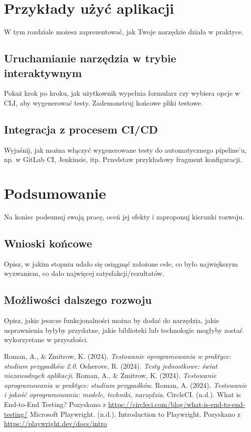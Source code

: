 \documentclass[12pt]{report}
\begin{document}
\chapter{Przykłady użyć aplikacji}
{W tym rozdziale możesz zaprezentować, jak Twoje narzędzie działa w praktyce.}

\section{Uruchamianie narzędzia w trybie interaktywnym}
{Pokaż krok po kroku, jak użytkownik wypełnia formularz czy wybiera opcje w CLI, aby wygenerować testy. Zademonstruj końcowe pliki testowe.}

\section{Integracja z procesem CI/CD}
{Wyjaśnij, jak można włączyć wygenerowane testy do automatycznego pipeline’u, np. w GitLab CI, Jenkinsie, itp. Przedstaw przykładowy fragment konfiguracji.}


\chapter{Podsumowanie}
{Na koniec podsumuj swoją pracę, oceń jej efekty i zaproponuj kierunki rozwoju.}

\section{Wnioski końcowe}
{Opisz, w jakim stopniu udało się osiągnąć założone cele, co było największym wyzwaniem, co dało najwięcej satysfakcji/rezultatów.}

\section{Możliwości dalszego rozwoju}
{Opisz, jakie jeszcze funkcjonalności można by dodać do narzędzia, jakie usprawnienia byłyby przydatne, jakie biblioteki lub technologie mogłyby zostać wykorzystane w przyszłości.}


\begin{thebibliography}{9}
     Roman, A., \& Zmitrow, K. (2024). \textit{Testowanie oprogramowania w praktyce: studium przypadków 2.0}.
     Osherove, R. (2024). \textit{Testy jednostkowe: świat niezawodnych aplikacji}.
     Roman, A., \& Zmitrow, K. (2024). \textit{Testowanie oprogramowania w praktyce: studium przypadków}.
     Roman, A. (2024). \textit{Testowanie i jakość oprogramowania: modele, techniki, narzędzia}.
     CircleCI. (n.d.). What is End-to-End Testing? Pozyskano z \url{https://circleci.com/blog/what-is-end-to-end-testing/}
     Microsoft Playwright. (n.d.). Introduction to Playwright. Pozyskano z \url{https://playwright.dev/docs/intro}
\end{thebibliography}
\end{document}
